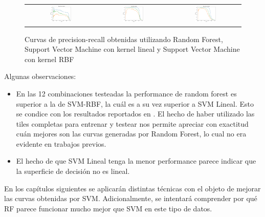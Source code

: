 \begin{figure}[h!]
\begin{center}
\begin{tabular}{ccc}
\includegraphics[width=0.32\textwidth]{Kap3/test_results_train=b360Test=b234.png} &
\includegraphics[width=0.32\textwidth]{Kap3/test_results_train=b360Test=b261.png} &
\includegraphics[width=0.32\textwidth]{Kap3/test_results_train=b360Test=b278.png}

\end{tabular}

\end{center}
\caption[short]{Curvas de precision-recall obtenidas utilizando Random Forest, Support Vector Machine con kernel lineal y Support Vector Machine con kernel RBF}
\label{fig:testresults}

\end{figure}

\newpage
Algunas observaciones:

\begin{itemize}

\item En las 12 combinaciones testeadas la performance de random forest es superior a la de SVM-RBF, la cuál es a su vez superior a SVM Lineal. Esto se condice con los resultados reportados en \cite{jbc}. El hecho de haber utilizado las tiles completas para entrenar y testear nos permite apreciar con exactitud cuán mejores son las curvas generadas por Random Forest, lo cual no era evidente en trabajos previos.

\item El hecho de que SVM Lineal tenga la menor performance parece indicar que la superficie de decisión no es lineal.

\end{itemize}

En los capítulos siguientes se aplicarán distintas técnicas con el objeto de mejorar las curvas obtenidas por SVM. Adicionalmente, se intentará comprender por qué RF parece funcionar mucho mejor que SVM en este tipo de datos.